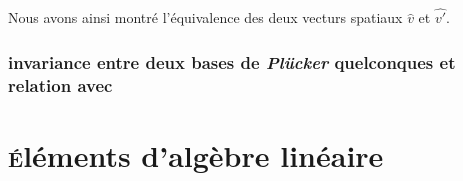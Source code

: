 Nous avons ainsi montré l'équivalence des deux vecturs spatiaux $\widehat{v}$ et $\widehat{v'}$.

\subsection{invariance entre deux bases de \emph{Plücker} quelconques et relation avec }


\chapter{\textsc{é}léments d'algèbre linéaire} \label{appx_algLineaire}



